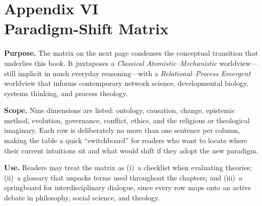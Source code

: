 \chapter{Appendix VI \\ Paradigm-Shift Matrix}

\noindent
\textbf{Purpose.}  The matrix on the next page condenses the conceptual transition that underlies this book.  It juxtaposes a \emph{Classical Atomistic–Mechanistic} worldview—still implicit in much everyday reasoning—with a \emph{Relational–Process Emergent} worldview that informs contemporary network science, developmental biology, systems thinking, and process theology.  

\noindent
\textbf{Scope.}  Nine dimensions are listed: ontology, causation, change, epistemic method, evolution, governance, conflict, ethics, and the religious or theological imaginary.  Each row is deliberately no more than one sentence per column, making the table a quick “switchboard” for readers who want to locate where their current intuitions sit and what would shift if they adopt the new paradigm.

\noindent
\textbf{Use.}  Readers may treat the matrix as (i)~a checklist when evaluating theories; (ii)~a glossary that unpacks terms used throughout the chapters; and (iii)~a springboard for interdisciplinary dialogue, since every row maps onto an active debate in philosophy, social science, and theology.

\bigskip

